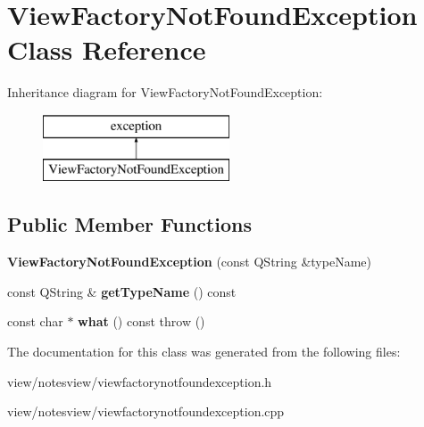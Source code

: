 \hypertarget{class_view_factory_not_found_exception}{\section{View\-Factory\-Not\-Found\-Exception Class Reference}
\label{class_view_factory_not_found_exception}
}
Inheritance diagram for View\-Factory\-Not\-Found\-Exception\-:\begin{figure}[H]
\begin{center}
\leavevmode
\includegraphics[height=2.000000cm]{class_view_factory_not_found_exception}
\end{center}
\end{figure}
\subsection*{Public Member Functions}
\begin{DoxyCompactItemize}
\item 
\hypertarget{class_view_factory_not_found_exception_a7fb3a95d0f9ff511586f2728b029752c}{{\bfseries View\-Factory\-Not\-Found\-Exception} (const Q\-String \&type\-Name)}\label{class_view_factory_not_found_exception_a7fb3a95d0f9ff511586f2728b029752c}

\item 
\hypertarget{class_view_factory_not_found_exception_a98f8daed68effc95f562ddfad156e06f}{const Q\-String \& {\bfseries get\-Type\-Name} () const }\label{class_view_factory_not_found_exception_a98f8daed68effc95f562ddfad156e06f}

\item 
\hypertarget{class_view_factory_not_found_exception_aa02ef6f46e34b243f1429eb40c88cd20}{const char $\ast$ {\bfseries what} () const   throw ()}\label{class_view_factory_not_found_exception_aa02ef6f46e34b243f1429eb40c88cd20}

\end{DoxyCompactItemize}


The documentation for this class was generated from the following files\-:\begin{DoxyCompactItemize}
\item 
view/notesview/viewfactorynotfoundexception.\-h\item 
view/notesview/viewfactorynotfoundexception.\-cpp\end{DoxyCompactItemize}
